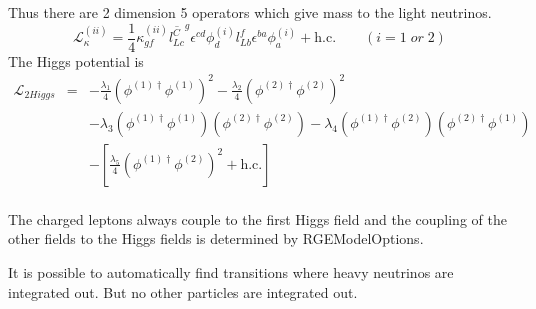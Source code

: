 \documentclass[10pt,a4paper,twoside]{scrartcl}
\begin{document}
Thus there are 2 dimension 5 operators which give mass to the light neutrinos.
\begin{equation*}
  \mathcal{L}_\kappa^{(ii)}=\frac{1}{4}\kappa_{gf}^{(ii)}\overline{l_{Lc}^C}^g\epsilon^{cd}\phi_d^{(i)}l_{Lb}^f\epsilon^{ba}\phi_a^{(i)}+\mathrm{h.c.}\quad\quad(i=1\;
  or\; 2)
\end{equation*}
The Higgs potential is
\begin{eqnarray*}
\mathcal{L}_{2Higgs}&=& -\frac{\lambda_1}{4}
\left(\phi^{(1)\dagger}\phi^{(1)}\right)^2 -\frac{\lambda_2}{4}
\left(\phi^{(2)\dagger}\phi^{(2)}\right)^2\\
&&-\lambda_3\left(\phi^{(1)\dagger}\phi^{(1)}\right)\left(\phi^{(2)\dagger}\phi^{(2)}\right)
-\lambda_4\left(\phi^{(1)\dagger}\phi^{(2)}\right)\left(\phi^{(2)\dagger}\phi^{(1)}\right)
\\ &&
-\left[\frac{\lambda_5}{4}\left(\phi^{(1)\dagger}\phi^{(2)}\right)^2+\mathrm{h.c.}\right]\\
\end{eqnarray*}

The charged leptons always couple to the first Higgs field and the coupling of
the other fields to the Higgs fields is determined by RGEModelOptions.

It is possible to automatically find transitions where heavy neutrinos are
integrated out.  But no other particles are integrated out.
\end{document}

